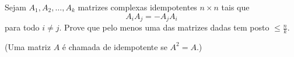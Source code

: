 Sejam \(A_1,A_2,\ldots,A_k\) matrizes complexas idempotentes \(n\times n\) tais que
\[
A_iA_j = -A_jA_i
\]
para todo \(i\ne j\).
Prove que pelo menos uma das matrizes dadas tem posto \(\le \frac{n}{k}\).

(Uma matriz \(A\) é chamada de idempotente se \(A^2=A\).)
